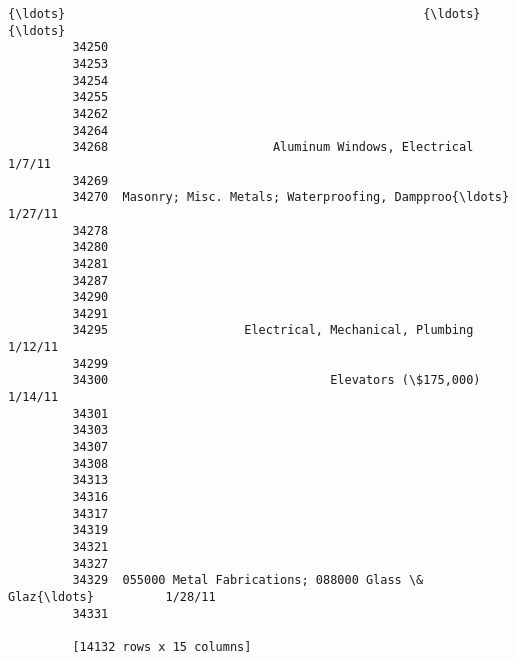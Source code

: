 \documentclass[11pt]{article}
\begin{document}
\begin{Verbatim}[commandchars=\\\{\}]
         {\ldots}                                                  {\ldots}              {\ldots}  
         34250                                                                      
         34253                                                                      
         34254                                                                      
         34255                                                                      
         34262                                                                      
         34264                                                                      
         34268                       Aluminum Windows, Electrical           1/7/11  
         34269                                                                      
         34270  Masonry; Misc. Metals; Waterproofing, Dampproo{\ldots}          1/27/11  
         34278                                                                      
         34280                                                                      
         34281                                                                      
         34287                                                                      
         34290                                                                      
         34291                                                                      
         34295                   Electrical, Mechanical, Plumbing          1/12/11  
         34299                                                                      
         34300                               Elevators (\$175,000)          1/14/11  
         34301                                                                      
         34303                                                                      
         34307                                                                      
         34308                                                                      
         34313                                                                      
         34316                                                                      
         34317                                                                      
         34319                                                                      
         34321                                                                      
         34327                                                                      
         34329  055000 Metal Fabrications; 088000 Glass \& Glaz{\ldots}          1/28/11  
         34331                                                                      
         
         [14132 rows x 15 columns]
\end{Verbatim}
            
\end{document}
